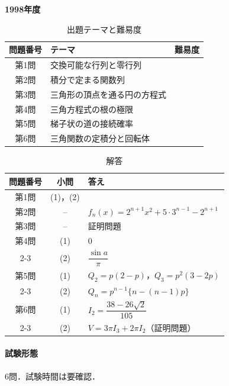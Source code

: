 \documentclass[../../main.tex]{subfiles}
\begin{document}
\begin{center}
  {\fontsize{48pt}{58pt}\selectfont \textbf{1998}\normalsize\textbf{年度}}
\end{center}

\begin{table}[htb]
  \centering
  \caption{出題テーマと難易度}
  \begin{tabular}{|c|p{9cm}|c|}
    \hline
    \textbf{問題番号} & \textbf{テーマ} & \textbf{難易度} \\
    \hline
    第1問 & 交換可能な行列と零行列 & \\
    \hline
    第2問 & 積分で定まる関数列 & \\
    \hline
    第3問 & 三角形の頂点を通る円の方程式 & \\
    \hline
    第4問 & 三角方程式の根の極限 & \\
    \hline
    第5問 & 梯子状の道の接続確率 & \\
    \hline
    第6問 & 三角関数の定積分と回転体 & \\
    \hline
  \end{tabular}
\end{table}

\begin{table}[htb]
  \centering
  \caption{解答}
  \renewcommand{\arraystretch}{1.4}
  \begin{tabular}{|c|c|p{9cm}|}
    \hline
    \textbf{問題番号} & \textbf{小問} & \textbf{答え} \\
    \hline
    第1問 & (1)，(2) &  \\
    \hline
    第2問 & -- & $f_n(x)=2^{n+1}x^2+5\cdot3^{n-1}-2^{n+1}$ \\
    \hline
    第3問 & -- & 証明問題 \\
    \hline
    第4問 & (1) & $0$ \\
    \cline{2-3}
    & (2) & $\dfrac{\sin a}{\pi}$ \\
    \hline
    第5問 & (1) & $Q_2=p(2-p)$，$Q_3=p^2(3-2p)$ \\
    \cline{2-3}
    & (2) & $Q_n=p^{n-1}\{n-(n-1)p\}$ \\
    \hline
    第6問 & (1) & $I_2=\dfrac{38-26\sqrt{2}}{105}$ \\
    \cline{2-3}
    & (2) & $V=3\pi I_3+2\pi I_2$（証明問題） \\
    \hline
  \end{tabular}
\end{table}

\paragraph{試験形態}
6問．試験時間は要確認．
\end{document}
